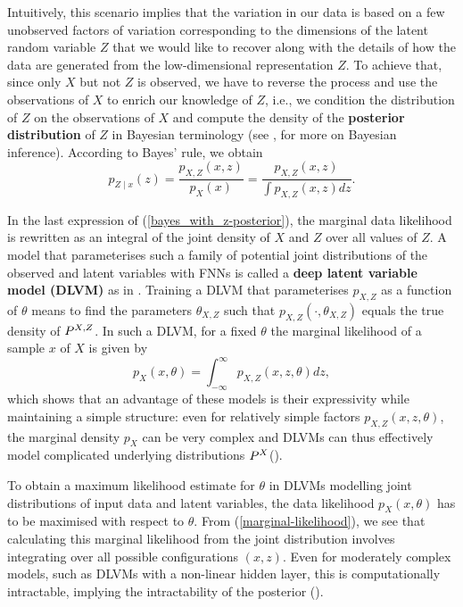 Intuitively, this scenario implies that the variation in our data is based on a few unobserved factors of variation corresponding to the dimensions of the latent random variable $Z$ that we would like to recover along with the details of how the data are generated from the low-dimensional representation $Z$. To achieve that, since only $X$ but not $Z$ is observed, we have to reverse the process and use the observations of $X$ to enrich our knowledge of $Z$, i.e., we condition the distribution of $Z$ on the observations of $X$ and compute the density of the \textbf{posterior distribution} of $Z$ in Bayesian terminology (see \cite[pp.~57-63]{Czado2011}, \cite[p.~70]{Kingma2019} for more on Bayesian inference). According to Bayes' rule, we obtain
\begin{equation}\label{bayes_with_z-posterior}
p_{Z\mid x}(z) = \frac{p_{X,Z}(x, z)}{p_{X}(x)} = \frac{p_{X,Z}(x, z)}{\int p_{X,Z}(x, z) dz}.
\end{equation}

In the last expression of (\ref{bayes_with_z-posterior}), the marginal data likelihood is rewritten as an integral of the joint density of $X$ and $Z$ over all values of $Z$. A model that parameterises such a family of potential joint distributions of the observed and latent variables with FNNs is called a \textbf{deep latent variable model (DLVM)} as in \cite[pp.~12f.]{Kingma2019}. 
Training a DLVM that parameterises $p_{X,Z}$ as a function of $\theta$ means to find the parameters $\theta_{X,Z}$ such that $p_{X,Z}(\cdot, \theta_{X,Z})$ equals the true density of $\P^{X,Z}$.  
In such a DLVM, for a fixed $\theta$ the marginal likelihood of a sample $x$ of $X$ is given by
\begin{equation}\label{marginal-likelihood}
	p_X(x,\theta) = \int_{-\infty}^{\infty} p_{X,Z}(x,z,\theta)dz,	
\end{equation}
which shows that an advantage of these models is their expressivity while maintaining a simple structure: even for relatively simple factors $p_{X,Z}(x,z,\theta)$, the marginal density $p_{X}$ can be very complex and DLVMs can thus effectively model complicated underlying distributions $\P^X$(\cite[pp.~12f.]{Kingma2019}). 

To obtain a maximum likelihood estimate for $\theta$ in DLVMs modelling joint distributions of input data and latent variables, the data likelihood $p_{X}(x,\theta)$ has to be maximised with respect to $\theta$. 
From (\ref{marginal-likelihood}), we see that calculating this marginal likelihood from the joint distribution involves integrating over all possible configurations $(x,z)$. Even for moderately complex models, such as DLVMs with a non-linear hidden layer, this is computationally intractable, implying the intractability of the posterior (\cite[p.~13]{Kingma2019}).

